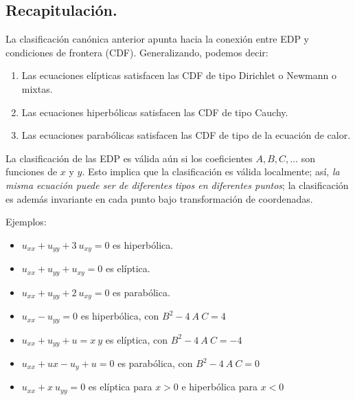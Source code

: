 \subsection*{Recapitulación.}
La clasificación canónica anterior apunta hacia la conexión entre EDP y condiciones de frontera (CDF). Generalizando, podemos decir:
\begin{enumerate}[label=\alph*)]
\item Las ecuaciones elípticas satisfacen las CDF de tipo Dirichlet o Newmann o mixtas.
\item Las ecuaciones hiperbólicas satisfacen las CDF de tipo Cauchy.
\item Las ecuaciones parabólicas satisfacen las CDF de tipo de la ecuación de calor.
\end{enumerate}
La clasificación de las EDP es válida aún si los coeficientes $A, B, C,\ldots$ son funciones de $x$ y $y$. Esto implica que la clasificación es válida localmente; así, \emph{la misma ecuación puede ser de diferentes tipos en diferentes puntos}; la clasificación es además invariante en cada punto bajo transformación de coordenadas.
\par
Ejemplos:
\begin{itemize}
\item $u_{xx} + u_{yy} + 3 \: u_{xy} = 0$ es hiperbólica.
\item $u_{xx} + u_{yy} + u_{xy} = 0$ es elíptica.
\item $u_{xx} + u_{yy} + 2 \: u_{xy} = 0$ es parabólica.
\item $u_{xx} - u_{yy} = 0$ es hiperbólica, con $B^{2} - 4 \: A \: C = 4$
\item $u_{xx} + u_{yy} + u = x \: y$ es elíptica, con $B^{2} - 4 \: A \: C = -4$
\item  $u_{xx} + u{x} - u_{y} + u = 0$ es parabólica, con $B^{2}- 4 \: A \: C = 0$
\item $u_{xx} + x \: u_{yy} = 0$ es elíptica para $x > 0$ e hiperbólica para $x < 0$
\end{itemize}
\newpage
